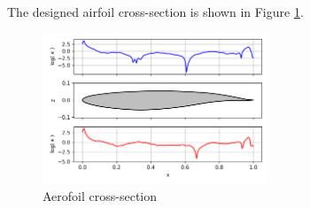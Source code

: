 \documentclass[11pt]{article}
\begin{document}


The designed airfoil cross-section is shown in Figure \ref{fig:airfoil}.



\begin{figure}[H]
    \centering
    \includegraphics[width=0.6\textwidth]{figures/airfoil.png}
    \caption{Aerofoil cross-section}
    \label{fig:airfoil}
\end{figure}
\end{document}
